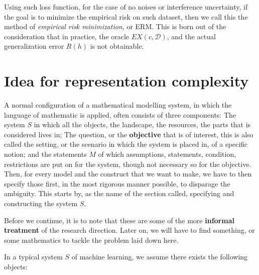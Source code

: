 \documentclass[10pt]{article}
\begin{document}
Using such loss function, for the case of no noises or interference uncertainty, if the goal is to minimize the empirical risk on such dataset, then we call this the method of \textit{empirical risk minimization}, or ERM. This is born out of the consideration that in practice, the oracle $EX(c,\mathcal{D})$, and the actual generalization error $R(h)$ is not obtainable. 

\section{Idea for representation complexity}
A normal configuration of a mathematical modelling system, in which the language of mathematic is applied, often consists of three components: The system $S$ in which all the objects, the landscape, the resources, the parts that is considered lives in; The question, or the \textbf{objective} that is of interest, this is also called the setting, or the scenario in which the system is placed in, of a specific notion; and the statements $M$ of which assumptions, statements, condition, restrictions are put on for the system, though not necessary so for the objective. Then, for every model and the construct that we want to make, we have to then specify those first, in the most rigorous manner possible, to disparage the ambiguity. This starts by, as the name of the section called, specifying and constructing the system $S$. 

Before we continue, it is to note that these are some of the more \textbf{informal treatment} of the research direction. Later on, we will have to find something, or some mathematics to tackle the problem laid down here. 

In a typical system $S$ of machine learning, we assume there exists the following objects: 
\end{document}
